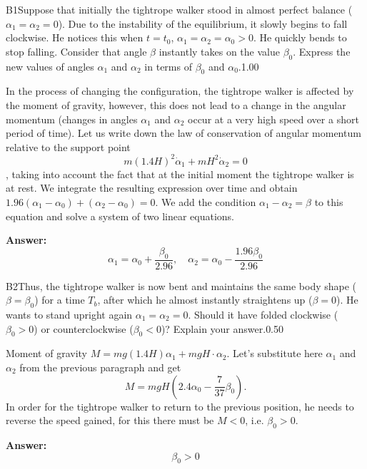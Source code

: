 \documentclass[11pt,a4paper]{article}
\begin{document}
\begin{solcard}{B1}{Suppose that initially the tightrope walker stood in almost perfect balance ($\alpha_1=\alpha_2=0$). Due to the instability of the equilibrium, it slowly begins to fall clockwise. He notices this when $t=t_0$, $\alpha_1=\alpha_2=\alpha_0>0$. He quickly bends to stop falling. Consider that angle $\beta$ instantly takes on the value $\beta_0$. Express the new values of angles $\alpha_1$ and $\alpha_2$ in terms of $\beta_0$ and $\alpha_0$.}{1.00}

In the process of changing the configuration, the tightrope walker is affected by the moment of gravity, however, this does not lead to a change in the angular momentum (changes in angles $\alpha_1$ and $\alpha_2$ occur at a very high speed over a short period of time). Let us write down the law of conservation of angular momentum relative to the support point \[m(1.4H)^2 \dot{\alpha}_1+mH^2\dot{\alpha}_2 = 0\], taking into account the fact that at the initial moment the tightrope walker is at rest. We integrate the resulting expression over time and obtain $1.96(\alpha_1-\alpha_0) + (\alpha_2 - \alpha_0) = 0$. We add the condition $\alpha_1 - \alpha_2=\beta$ to this equation and solve a system of two linear equations.

\par\smallskip\noindent\textbf{Answer:} \[\alpha_1=\alpha_0+\frac{\beta_0}{2.96},\quad \alpha_2=\alpha_0-\frac{1.96 \beta_0}{2.96}\]
\end{solcard}

\begin{solcard}{B2}{Thus, the tightrope walker is now bent and maintains the same body shape ($\beta=\beta_0$) for a time $T_b$, after which he almost instantly straightens up ($\beta=0$). He wants to stand upright again $\alpha_1=\alpha_2=0$. Should it have folded clockwise ($\beta_0>0$) or counterclockwise ($\beta_0<0$)? Explain your answer.}{0.50}

Moment of gravity $M=mg (1.4H) \alpha_1+mgH⋅\alpha_2$. Let's substitute here $\alpha_1$ and $\alpha_2$ from the previous paragraph and get \[ M=mgH(2.4 \alpha_0-\frac{7}{37} \beta_0 ) .\]In order for the tightrope walker to return to the previous position, he needs to reverse the speed gained, for this there must be $M<0$, i.e. $\beta_0>0$.

\par\smallskip\noindent\textbf{Answer:} \[\beta_0>0\]
\end{solcard}
\end{document}
